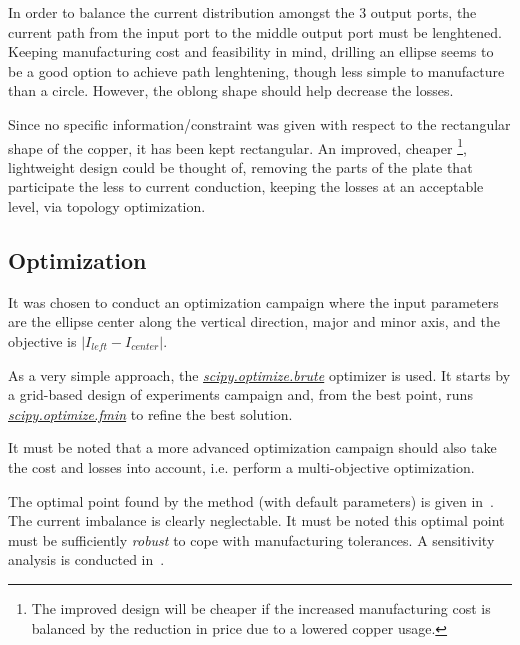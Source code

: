 \documentclass[10pt,a4paper]{article}
\begin{document}
In order to balance the current distribution amongst the 3 output ports,
the current path from the input port to the middle output port must be lenghtened.
Keeping manufacturing cost and feasibility in mind, drilling an ellipse seems to be a good option
to achieve path lenghtening, though less simple to manufacture than a circle.
However, the oblong shape should help decrease the losses.

Since no specific information/constraint was given with respect to the rectangular shape
of the copper, it has been kept rectangular.
An improved, cheaper
\footnote{The improved design will be cheaper if the increased manufacturing cost is balanced
by the reduction in price due to a lowered copper usage.},
lightweight design could be thought of,
removing the parts of the plate that participate the less to current
conduction, keeping the losses at an acceptable level, via topology optimization.

\subsection{Optimization}

It was chosen to conduct an optimization campaign where the input parameters are the
ellipse center along the vertical direction, major and minor axis, and the objective
is $\left| I_{left}-I_{center}\right|$.

As a very simple approach, the \href{
    https://docs.scipy.org/doc/scipy/reference/generated/scipy.optimize.brute.html
}{\emph{scipy.optimize.brute}} optimizer is used. It starts by a grid-based design of experiments campaign
and, from the best point, runs \href{
    https://docs.scipy.org/doc/scipy/reference/generated/scipy.optimize.fmin.html
}{\emph{scipy.optimize.fmin}} to refine the best solution.

It must be noted that a more advanced optimization campaign should also take the cost and losses into account,
i.e. perform a multi-objective optimization.

The optimal point found by the method (with default parameters) is given in~.
The current imbalance is clearly neglectable.
It must be noted this optimal point must be sufficiently \emph{robust} to
cope with manufacturing tolerances. A sensitivity analysis is conducted in~.
\end{document}
